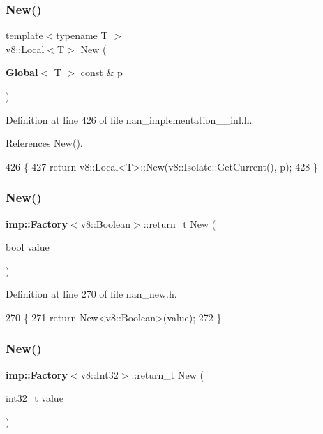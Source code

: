 \subsubsection{New()\hspace{0.1cm}{\footnotesize\ttfamily [10/22]}}
{\footnotesize\ttfamily template$<$typename T $>$ \\
v8\+::\+Local$<$T$>$ New (\begin{DoxyParamCaption}\item[{\textbf{ Global}$<$ T $>$ const \&}]{p }\end{DoxyParamCaption})}



Definition at line 426 of file nan\+\_\+implementation\+\_\+\_\+inl.\+h.



References New().


\begin{DoxyCode}
426                                           \{
427   \textcolor{keywordflow}{return} v8::Local<T>::New(v8::Isolate::GetCurrent(), p);
428 \}
\end{DoxyCode}
\mbox{\label{nan__new_8h_a5a32acdc4e85e01e8cd421dcc15db4ea}} 
\subsubsection{New()\hspace{0.1cm}{\footnotesize\ttfamily [11/22]}}
{\footnotesize\ttfamily \textbf{ imp\+::\+Factory}$<$v8\+::\+Boolean$>$\+::return\+\_\+t New (\begin{DoxyParamCaption}\item[{bool}]{value }\end{DoxyParamCaption})}



Definition at line 270 of file nan\+\_\+new.\+h.


\begin{DoxyCode}
270                 \{
271   \textcolor{keywordflow}{return} New<v8::Boolean>(value);
272 \}
\end{DoxyCode}
\mbox{\label{nan__new_8h_a3042cadc5703ff3bca66c239525e654a}} 
\subsubsection{New()\hspace{0.1cm}{\footnotesize\ttfamily [12/22]}}
{\footnotesize\ttfamily \textbf{ imp\+::\+Factory}$<$v8\+::\+Int32$>$\+::return\+\_\+t New (\begin{DoxyParamCaption}\item[{int32\+\_\+t}]{value }\end{DoxyParamCaption})}



